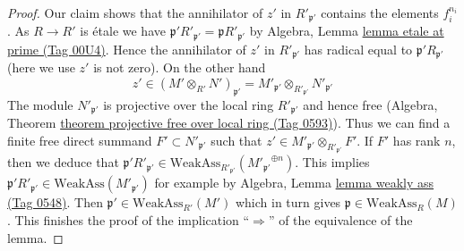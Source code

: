 \documentclass{amsart}
\theoremstyle{plain}
\theoremstyle{definition}
\theoremstyle{remark}
\numberwithin{equation}{subsection}
\begin{document}
\begin{proof}
\medskip\noindent
Our claim shows that the annihilator of $z'$ in $R'_{\mathfrak p'}$
contains the elements $f_i^{n_i}$. As $R \to R'$ is \'etale we have
$\mathfrak p'R'_{\mathfrak p'} = \mathfrak pR'_{\mathfrak p'}$
by Algebra, Lemma \href{https://stacks.math.columbia.edu/tag/00U4}{lemma etale at prime (Tag 00U4)}.
Hence the annihilator of $z'$ in $R'_{\mathfrak p'}$ has radical equal to
$\mathfrak p' R_{\mathfrak p'}$ (here we use $z'$ is not zero).
On the other hand
$$
z' \in (M' \otimes_{R'} N')_{\mathfrak p'} =
M'_{\mathfrak p'} \otimes_{R'_{\mathfrak p'}} N'_{\mathfrak p'}
$$
The module $N'_{\mathfrak p'}$ is projective over the local ring
$R'_{\mathfrak p'}$ and hence free
(Algebra, Theorem \href{https://stacks.math.columbia.edu/tag/0593}{theorem projective free over local ring (Tag 0593)}).
Thus we can find a finite free direct summand $F' \subset N'_{\mathfrak p'}$
such that $z' \in M'_{\mathfrak p'} \otimes_{R'_{\mathfrak p'}} F'$.
If $F'$ has rank $n$, then we deduce that
$\mathfrak p' R'_{\mathfrak p'} \in
\text{WeakAss}_{R'_{\mathfrak p'}}({M'_{\mathfrak p'}}^{\oplus n})$.
This implies
$\mathfrak p'R'_{\mathfrak p'} \in \text{WeakAss}(M'_{\mathfrak p'})$
for example by Algebra, Lemma \href{https://stacks.math.columbia.edu/tag/0548}{lemma weakly ass (Tag 0548)}.
Then $\mathfrak p' \in \text{WeakAss}_{R'}(M')$
which in turn gives $\mathfrak p \in \text{WeakAss}_R(M)$.
This finishes the proof of the implication
``$\Rightarrow$'' of the equivalence of the lemma.


\end{proof}
\end{document}
